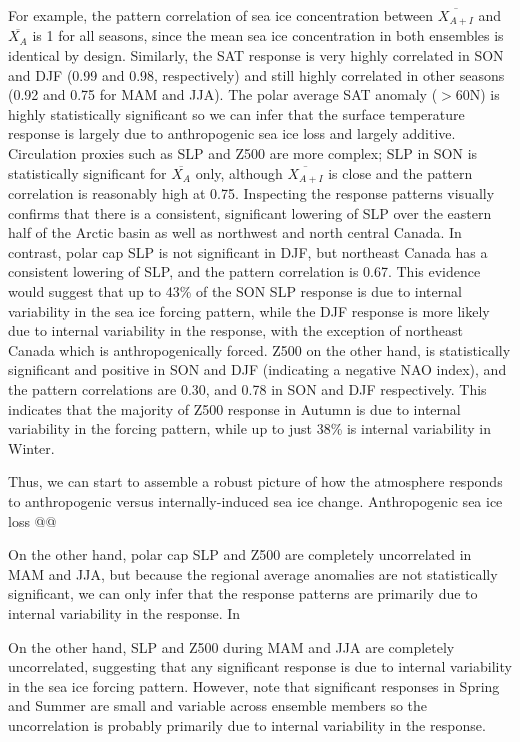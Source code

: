 \documentclass[12pt]{article}
\begin{document}
For example, the pattern correlation of sea ice concentration between $\overline{X_{A+I}}$ and $\overline{X_{A}}$ is 1 for all seasons, since the mean sea ice concentration in both ensembles is identical by design. Similarly, the SAT response is very highly correlated in SON and DJF (0.99 and 0.98, respectively) and still highly correlated in other seasons (0.92 and 0.75 for MAM and JJA). The polar average SAT anomaly ($>$60N) is highly statistically significant so we can infer that the surface temperature response is largely due to anthropogenic sea ice loss and largely additive. Circulation proxies such as SLP and Z500 are more complex; SLP in SON is statistically significant for $\overline{X_{A}}$ only, although $\overline{X_{A+I}}$ is close and the pattern correlation is reasonably high at 0.75. Inspecting the response patterns visually confirms that there is a consistent, significant lowering of SLP over the eastern half of the Arctic basin as well as northwest and north central Canada. In contrast, polar cap SLP is not significant in DJF, but northeast Canada has a consistent lowering of SLP, and the pattern correlation is 0.67. This evidence would suggest that up to 43\% of the SON SLP response is due to internal variability in the sea ice forcing pattern, while the DJF response is more likely due to internal variability in the response, with the exception of northeast Canada which is anthropogenically forced. Z500 on the other hand, is statistically significant and positive in SON and DJF (indicating a negative NAO index), and the pattern correlations are 0.30, and 0.78 in SON and DJF respectively. This indicates that the majority of Z500 response in Autumn is due to internal variability in the forcing pattern, while up to just 38\% is internal variability in Winter. 

Thus, we can start to assemble a robust picture of how the atmosphere responds to anthropogenic versus internally-induced sea ice change. Anthropogenic sea ice loss @@

On the other hand, polar cap SLP and Z500 are completely uncorrelated in MAM and JJA, but because the regional average anomalies are not statistically significant, we can only infer that the response patterns are primarily due to internal variability in the response. In 


On the other hand, SLP and Z500 during MAM and JJA are completely uncorrelated, suggesting that any significant response is due to internal variability in the sea ice forcing pattern. However, note that significant responses in Spring and Summer are small and variable across ensemble members so the uncorrelation is probably primarily due to internal variability in the response.
\end{document}
